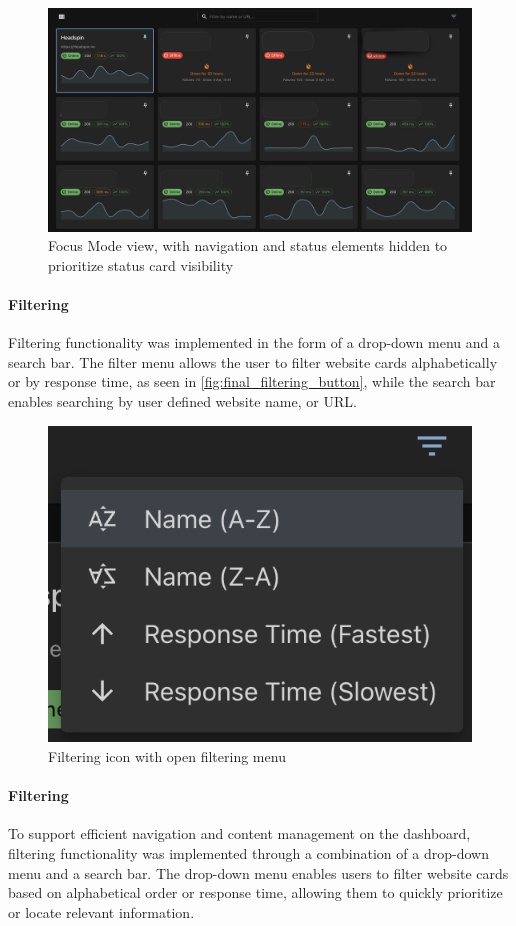\begin{figure}[H]
\centering
\includegraphics[width=0.8\linewidth]{figures/MVP-dashboard/MVP-focus-mode.png}
\caption{Focus Mode view, with navigation and status elements hidden to prioritize status card visibility}
\label{fig:mvp_focus_mode}
\end{figure}

\paragraph{Filtering}
Filtering functionality was implemented in the form of a drop-down menu and a search bar. The filter menu allows the user to filter website cards alphabetically or by response time, as seen in \autoref{fig:final_filtering_button}, while the search bar enables searching by user defined website name, or URL.

\begin{figure}[H]
    \centering
    \includegraphics[width=0.5\linewidth]{figures/final_application/final-filteringbutton.png}
    \caption{Filtering icon with open filtering menu}
    \label{fig:final_filtering_button}
\end{figure}

\paragraph{Filtering}

To support efficient navigation and content management on the dashboard, filtering functionality was implemented through a combination of a drop-down menu and a search bar. The drop-down menu enables users to filter website cards based on alphabetical order or response time, allowing them to quickly prioritize or locate relevant information.

